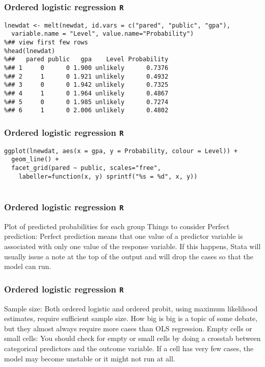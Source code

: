 \documentclass[00-GLMregslides.tex]{subfiles}
\begin{document}
\begin{frame}[fragile]
	\frametitle{Ordered logistic regression \texttt{R} }
	\Large
	
\begin{framed}
	\begin{verbatim}
lnewdat <- melt(newdat, id.vars = c("pared", "public", "gpa"),
  variable.name = "Level", value.name="Probability")
%## view first few rows
%head(lnewdat)
%##   pared public   gpa    Level Probability
%## 1     0      0 1.900 unlikely      0.7376
%## 2     1      0 1.921 unlikely      0.4932
%## 3     0      0 1.942 unlikely      0.7325
%## 4     1      0 1.964 unlikely      0.4867
%## 5     0      0 1.985 unlikely      0.7274
%## 6     1      0 2.006 unlikely      0.4802
\end{verbatim}
\end{framed}
\end{frame}
\begin{frame}[fragile]
	\frametitle{Ordered logistic regression \texttt{R} }
	\Large
	
	\begin{framed}
		\begin{verbatim}
ggplot(lnewdat, aes(x = gpa, y = Probability, colour = Level)) +
  geom_line() +
  facet_grid(pared ~ public, scales="free",
    labeller=function(x, y) sprintf("%s = %d", x, y))
    
\end{verbatim}
\end{framed}

\end{frame}

\begin{frame}[fragile]
	\frametitle{Ordered logistic regression \texttt{R} }
	\Large
Plot of predicted probabilities for each group
Things to consider
Perfect prediction: Perfect prediction means that one value of a predictor variable is associated with only one value of the response variable. If this happens, Stata will usually issue a note at the top of the output and will drop the cases so that the model can run.
\end{frame}

\begin{frame}[fragile]
	\frametitle{Ordered logistic regression \texttt{R} }
	\Large
Sample size: Both ordered logistic and ordered probit, using maximum likelihood estimates, require sufficient sample size. How big is big is a topic of some debate, but they almost always require more cases than OLS regression.
Empty cells or small cells: You should check for empty or small cells by doing a crosstab between categorical predictors and the outcome variable. If a cell has very few cases, the model may become unstable or it might not run at all.
\end{frame}
\end{document}
